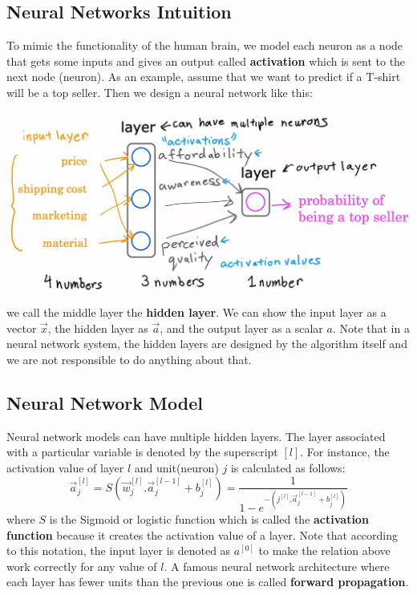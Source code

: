 \documentclass[a4paper, 12pt]{book}
\begin{document}
\subsection{Neural Networks Intuition}
To mimic the functionality of the human brain, we model each neuron as a node that gets some inputs and gives an output called \textbf{activation} which is sent to the next node (neuron). As an example, assume that we want to predict if a T-shirt will be a top seller. Then we design a neural network like this:
\begin{center}
    \includegraphics[width=6in]{graphics/NN-Intuition.png}
\end{center}
we call the middle layer the \textbf{hidden layer}. We can show the input layer as a vector $\Vec{x}$, the hidden layer as $\Vec{a}$, and the output layer as a scalar $a$. Note that in a neural network system, the hidden layers are designed by the algorithm itself and we are not responsible to do anything about that.
\subsection{Neural Network Model}
Neural network models can have multiple hidden layers. The layer associated with a particular variable is denoted by the superscript $[l]$. For instance, the activation value of layer $l$ and unit(neuron) $j$ is calculated as follows: \[\Vec{a}_j^{[l]} = S(\Vec{w}_j^{[l]}.\Vec{a}_j^{[l-1]} + b_j^{[l]}) = \frac{1}{1 - e^{-(j^{[l]}.\Vec{a}_j^{[l-1]} + b_j^{[l]})}}\] where $S$ is the Sigmoid or logistic function which is called the \textbf{activation function} because it creates the activation value of a layer. Note that according to this notation, the input layer is denoted as $a^{[0]}$ to make the relation above work correctly for any value of $l$. A famous neural network architecture where each layer has fewer units than the previous one is called \textbf{forward propagation}.
\end{document}
